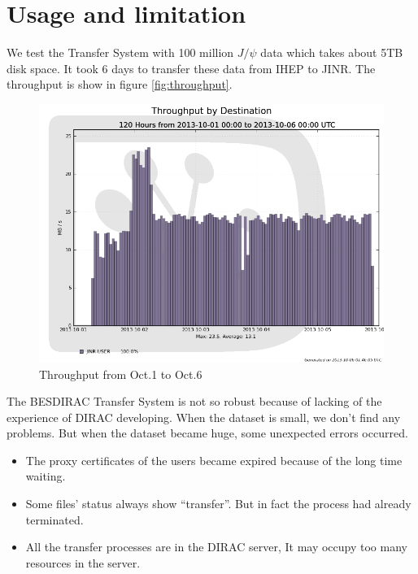 \section{Usage and limitation}
We test the Transfer System with 100 million $J/\psi$ data 
which takes about 5TB disk space. It took 6 days to transfer 
these data from IHEP to JINR. The throughput is show in 
figure \ref{fig:throughput}.

\begin{figure}
    \begin{center}
        \includegraphics[width=\textwidth, keepaspectratio]{data/throughput-dest-1001-10-06.png}
    \end{center}
    \caption{Throughput from Oct.1 to Oct.6}
\end{figure}

The BESDIRAC Transfer System is not so robust
because of lacking of the experience of DIRAC developing.
When the dataset is small, we don't find any problems.
But when the dataset became huge, some unexpected errors occurred.
\begin{itemize}
    \item The proxy certificates of the users became expired
            because of the long time waiting.
    \item Some files' status always show ``transfer''.
            But in fact the process had already terminated.
    \item All the transfer processes are in the DIRAC server,
            It may occupy too many resources in the server.
\end{itemize}
